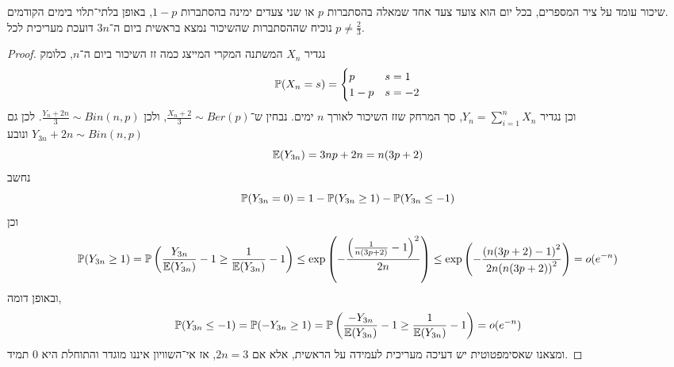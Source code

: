 \question{}
שיכור עומד על ציר המספרים, בכל יום הוא צועד צעד אחד שמאלה בהסתברות $p$ או שני צעדים ימינה בהסתברות $1 - p$, באופן בלתי־תלוי בימים הקודמים. \\
נוכיח שההסתברות שהשיכור נמצא בראשית ביום ה־$3n$ דועכת מעריכית לכל $p \ne \frac{2}{3}$.
\begin{proof}
	נגדיר $X_n$ המשתנה המקרי המייצג כמה זז השיכור ביום ה־$n$, כלומק
	\[
		\mathbb{P}(X_n = s)
		= \begin{cases}
			p & s = 1 \\
			1 - p & s = -2
		\end{cases}
	\]
	וכן נגדיר $Y_n = \sum_{i = 1}^{n} X_n$, סך המרחק שזז השיכור לאורך $n$ ימים.
	נבחין ש־$\frac{X_n + 2}{3} \sim Ber(p)$, ולכן $\frac{Y_n + 2n}{3} \sim Bin(n, p)$.
	לכן גם $Y_{3n} + 2n \sim Bin(n, p)$ ונובע
	\[
		\mathbb{E}(Y_{3n})
		= 3np + 2n
		= n(3p + 2)
	\]
	נחשב
	\[
		\mathbb{P}(Y_{3n} = 0)
		= 1 - \mathbb{P}(Y_{3n} \ge 1) - \mathbb{P}(Y_{3n} \le -1)
	\]
	וכן
	\[
		\mathbb{P}(Y_{3n} \ge 1)
		= \mathbb{P}\left(\frac{Y_{3n}}{\mathbb{E}(Y_{3n})} - 1 \ge \frac{1}{\mathbb{E}(Y_{3n})} - 1\right)
		\le \exp\left(- \frac{{\left(\frac{1}{n(3p + 2)} - 1\right)}^2}{2n}\right)
		\le \exp\left(- \frac{{\left(n(3p + 2) - 1\right)}^2}{2n {(n(3p + 2))}^2}\right)
		= o(e^{-n})
	\]
	ובאופן דומה,
	\[
		\mathbb{P}(Y_{3n} \le -1)
		= \mathbb{P}(-Y_{3n} \ge 1)
		= \mathbb{P}\left(\frac{-Y_{3n}}{\mathbb{E}(Y_{3n})} - 1 \ge \frac{1}{\mathbb{E}(Y_{3n})} - 1\right)
		= o(e^{-n})
	\]
	ומצאנו שאסימפטוטית יש דעיכה מעריכית לעמידה על הראשית, אלא אם $2n = 3$, אז אי־השוויון איננו מוגדר והתוחלת היא 0 תמיד.
\end{proof}


